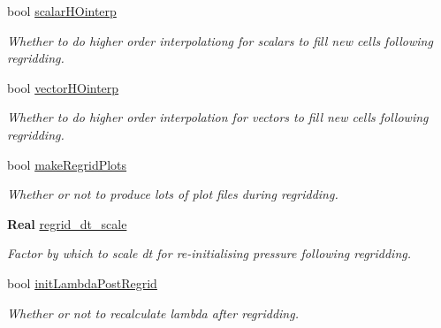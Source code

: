 \begin{DoxyCompactItemize}
bool \hyperlink{struct_mushy_layer_options_aa39139c0c6fe2cbe35efbf1a39ce5348}{scalar\+H\+Ointerp}
\begin{DoxyCompactList}\small\item\em Whether to do higher order interpolationg for scalars to fill new cells following regridding. \end{DoxyCompactList}\item 
\mbox{\label{struct_mushy_layer_options_ac2828ff84cc19039529d951819e8d082}} 
bool \hyperlink{struct_mushy_layer_options_ac2828ff84cc19039529d951819e8d082}{vector\+H\+Ointerp}
\begin{DoxyCompactList}\small\item\em Whether to do higher order interpolation for vectors to fill new cells following regridding. \end{DoxyCompactList}\item 
bool \hyperlink{struct_mushy_layer_options_aa149c736981aa04179325ffcef87bdba}{make\+Regrid\+Plots}
\begin{DoxyCompactList}\small\item\em Whether or not to produce lots of plot files during regridding. \end{DoxyCompactList}\item 
\mbox{\label{struct_mushy_layer_options_a6ffba979d8d897e01b6f81fadd4258d3}} 
\textbf{ Real} \hyperlink{struct_mushy_layer_options_a6ffba979d8d897e01b6f81fadd4258d3}{regrid\+\_\+dt\+\_\+scale}
\begin{DoxyCompactList}\small\item\em Factor by which to scale dt for re-\/initialising pressure following regridding. \end{DoxyCompactList}\item 
\mbox{\label{struct_mushy_layer_options_a1f577134d5979f35e74e1dc2b7cdacd3}} 
bool \hyperlink{struct_mushy_layer_options_a1f577134d5979f35e74e1dc2b7cdacd3}{init\+Lambda\+Post\+Regrid}
\begin{DoxyCompactList}\small\item\em Whether or not to recalculate lambda after regridding. \end{DoxyCompactList}\item 
\mbox{\label{struct_mushy_layer_options_a74ed5d4f02c0e0af01281446c30d3d7b}} 

\end{DoxyCompactItemize}
